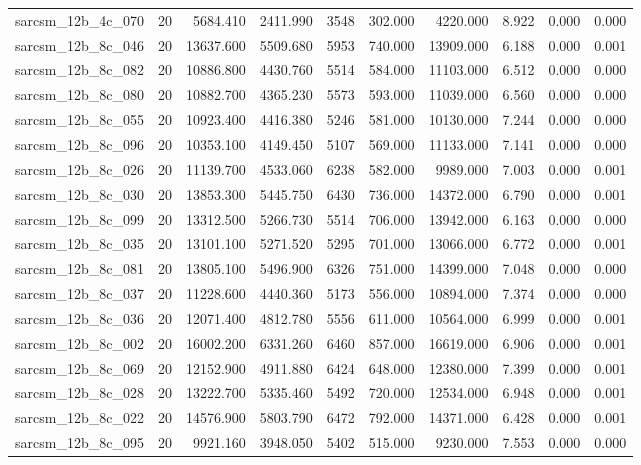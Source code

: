 \begin{tabular}{lrrrrrrrrr}
sarcsm\_12b\_4c\_070 & 20 & 5684.410 & 2411.990 & 3548 & 302.000 & 4220.000 & 8.922 & 0.000 & 0.000 \\
sarcsm\_12b\_8c\_046 & 20 & 13637.600 & 5509.680 & 5953 & 740.000 & 13909.000 & 6.188 & 0.000 & 0.001 \\
sarcsm\_12b\_8c\_082 & 20 & 10886.800 & 4430.760 & 5514 & 584.000 & 11103.000 & 6.512 & 0.000 & 0.000 \\
sarcsm\_12b\_8c\_080 & 20 & 10882.700 & 4365.230 & 5573 & 593.000 & 11039.000 & 6.560 & 0.000 & 0.000 \\
sarcsm\_12b\_8c\_055 & 20 & 10923.400 & 4416.380 & 5246 & 581.000 & 10130.000 & 7.244 & 0.000 & 0.000 \\
sarcsm\_12b\_8c\_096 & 20 & 10353.100 & 4149.450 & 5107 & 569.000 & 11133.000 & 7.141 & 0.000 & 0.000 \\
sarcsm\_12b\_8c\_026 & 20 & 11139.700 & 4533.060 & 6238 & 582.000 & 9989.000 & 7.003 & 0.000 & 0.001 \\
sarcsm\_12b\_8c\_030 & 20 & 13853.300 & 5445.750 & 6430 & 736.000 & 14372.000 & 6.790 & 0.000 & 0.001 \\
sarcsm\_12b\_8c\_099 & 20 & 13312.500 & 5266.730 & 5514 & 706.000 & 13942.000 & 6.163 & 0.000 & 0.000 \\
sarcsm\_12b\_8c\_035 & 20 & 13101.100 & 5271.520 & 5295 & 701.000 & 13066.000 & 6.772 & 0.000 & 0.001 \\
sarcsm\_12b\_8c\_081 & 20 & 13805.100 & 5496.900 & 6326 & 751.000 & 14399.000 & 7.048 & 0.000 & 0.000 \\
sarcsm\_12b\_8c\_037 & 20 & 11228.600 & 4440.360 & 5173 & 556.000 & 10894.000 & 7.374 & 0.000 & 0.000 \\
sarcsm\_12b\_8c\_036 & 20 & 12071.400 & 4812.780 & 5556 & 611.000 & 10564.000 & 6.999 & 0.000 & 0.001 \\
sarcsm\_12b\_8c\_002 & 20 & 16002.200 & 6331.260 & 6460 & 857.000 & 16619.000 & 6.906 & 0.000 & 0.001 \\
sarcsm\_12b\_8c\_069 & 20 & 12152.900 & 4911.880 & 6424 & 648.000 & 12380.000 & 7.399 & 0.000 & 0.001 \\
sarcsm\_12b\_8c\_028 & 20 & 13222.700 & 5335.460 & 5492 & 720.000 & 12534.000 & 6.948 & 0.000 & 0.001 \\
sarcsm\_12b\_8c\_022 & 20 & 14576.900 & 5803.790 & 6472 & 792.000 & 14371.000 & 6.428 & 0.000 & 0.001 \\
sarcsm\_12b\_8c\_095 & 20 & 9921.160 & 3948.050 & 5402 & 515.000 & 9230.000 & 7.553 & 0.000 & 0.000 \\

\end{tabular}
